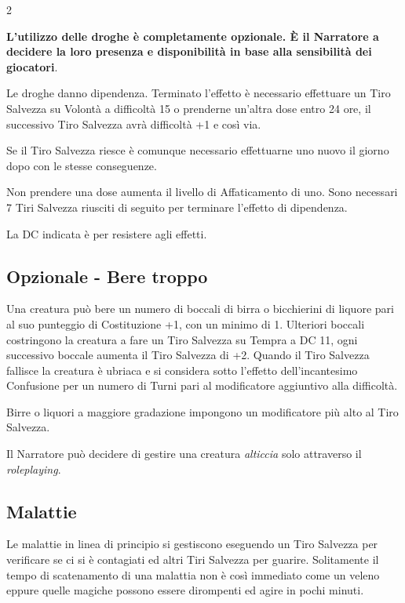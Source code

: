 \begin{multicols}{2}

\medskip

\textbf{L'utilizzo delle droghe è completamente opzionale. È il Narratore a decidere la loro presenza e disponibilità in base alla sensibilità dei giocatori}.

Le droghe danno dipendenza. Terminato l'effetto è necessario effettuare un Tiro Salvezza su Volontà a difficoltà 15 o prenderne un'altra dose entro 24 ore, il successivo Tiro Salvezza avrà difficoltà +1 e così via.

Se il Tiro Salvezza riesce è comunque necessario effettuarne uno nuovo il giorno dopo con le stesse conseguenze.

Non prendere una dose aumenta il livello di Affaticamento di uno. Sono necessari 7 Tiri Salvezza riusciti di seguito per terminare l'effetto di dipendenza.

La DC indicata è per resistere agli effetti.

\subsection{Opzionale - Bere troppo}\hypertarget{alcolismo}{}\label{beretroppo}

Una creatura può bere un numero di boccali di birra o bicchierini di liquore pari al suo punteggio di Costituzione +1, con un minimo di 1. Ulteriori boccali costringono la creatura a fare un Tiro Salvezza su Tempra a DC 11, ogni successivo boccale aumenta il Tiro Salvezza di +2. Quando il Tiro Salvezza fallisce la creatura è ubriaca e si considera sotto l'effetto dell'incantesimo Confusione per un numero di Turni pari al modificatore aggiuntivo alla difficoltà.

Birre o liquori a maggiore gradazione impongono un modificatore più alto al Tiro Salvezza.

Il Narratore può decidere di gestire una creatura \emph{alticcia} solo attraverso il \emph{roleplaying}.

\subsection{Malattie}\hypertarget{malattie}{}\label{malattie}

Le malattie in linea di principio si gestiscono eseguendo un Tiro Salvezza per verificare se ci si è contagiati ed altri Tiri Salvezza per guarire.
Solitamente il tempo di scatenamento di una malattia non è così immediato come un veleno eppure quelle magiche possono essere dirompenti ed agire in pochi minuti.


\end{multicols}
